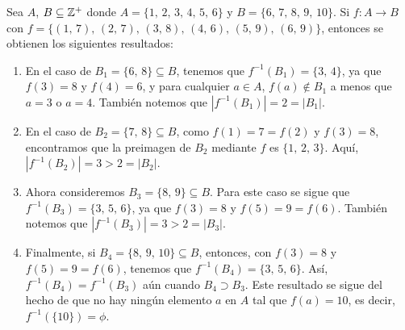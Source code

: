 \begin{myexample}
    Sea $A$, $B \subseteq \ZZ[+]$ donde $A = \{ 1, \, 2, \, 3, \, 4, \, 5, \, 6 \}$ y $B = \{ 6, \, 7, \, 8, \, 9, \, 10 \}$. Si $f:A \longrightarrow B$ con $f = \{ (1, \, 7), \, (2, \, 7), \, (3, \, 8), \, (4, \, 6), \, (5, \, 9), \, (6, \, 9) \}$, entonces se obtienen los siguientes resultados:
    \begin{enumerate}[label=\alph*)]
        \item En el caso de $B_1 = \{6, \, 8 \} \subseteq B$, tenemos que $f^{-1}(B_1) = \{3, \, 4\}$, ya que $f(3)=8$ y $f(4)=6$, y para cualquier $a \in A$, $f(a) \notin B_1$ a menos que $a=3$ o $a=4$. También notemos que $\left|f^{-1}(B_1) \right| = 2 = |B_1|$.
        \item En el caso de $B_2 = \{7, \, 8\} \subseteq B$, como $f(1) = 7 = f(2)$ y $f(3)=8$, encontramos que la preimagen de $B_2$ mediante $f$ es $\{1, \, 2, \, 3\}$. Aquí, $\left|f^{-1}(B_2)\right|=3 > 2 = |B_2|$.
        \item Ahora consideremos $B_3 = \{8, \, 9\} \subseteq B$. Para este caso se sigue que $f^{-1}(B_3) = \{3, \, 5, \, 6\}$, ya que $f(3) = 8$ y $f(5) = 9 = f(6)$. También notemos que $\left|f^{-1}(B_3) \right| = 3 > 2 = |B_3|$.
        \item Finalmente, si $B_4 = \{8, \, 9, \, 10\} \subseteq B$, entonces, con $f(3) = 8$ y $f(5) = 9 = f(6)$, tenemos que $f^{-1}(B_4) = \{3, \, 5, \, 6\}$. Así, $f^{-1}(B_4) = f^{-1}(B_3)$ aún cuando $B_4 \supset B_3$. Este resultado se sigue del hecho de que no hay ningún elemento $a$ en $A$ tal que $f(a) = 10$, es decir, $f^{-1}(\{10\}) = \phi$.
    \end{enumerate}
\end{myexample}

